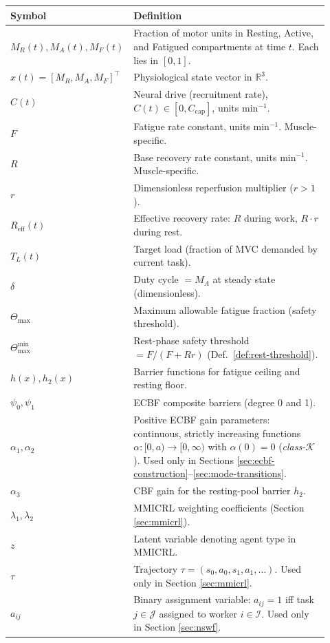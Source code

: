 \documentclass[11pt,a4paper]{article}
\begin{document}
\begin{center}
\begin{tabular}{p{0.30\linewidth}p{0.62\linewidth}}
\toprule
\textbf{Symbol} & \textbf{Definition} \\
\midrule
$M_R(t), M_A(t), M_F(t)$ & Fraction of motor units in Resting, Active, and Fatigued compartments at time $t$. Each lies in $[0,1]$. \\
$x(t) = [M_R, M_A, M_F]^\top$ & Physiological state vector in $\mathbb{R}^3$. \\
$C(t)$ & Neural drive (recruitment rate), $C(t) \in [0, C_{\mathrm{cap}}]$, units min$^{-1}$. \\
$F$ & Fatigue rate constant, units min$^{-1}$. Muscle-specific. \\
$R$ & Base recovery rate constant, units min$^{-1}$. Muscle-specific. \\
$r$ & Dimensionless reperfusion multiplier ($r > 1$). \\
$R_{\mathrm{eff}}(t)$ & Effective recovery rate: $R$ during work, $R \cdot r$ during rest. \\
$T_L(t)$ & Target load (fraction of MVC demanded by current task). \\
$\delta$ & Duty cycle $= M_A$ at steady state (dimensionless). \\
$\Theta_{\max}$ & Maximum allowable fatigue fraction (safety threshold). \\
$\Theta_{\max}^{\min}$ & Rest-phase safety threshold $= F/(F + Rr)$ (Def.~\ref{def:rest-threshold}). \\
$h(x), h_2(x)$ & Barrier functions for fatigue ceiling and resting floor. \\
$\psi_0, \psi_1$ & ECBF composite barriers (degree 0 and 1). \\
$\alpha_1, \alpha_2$ & Positive ECBF gain parameters: continuous, strictly increasing functions $\alpha:[0,a)\to[0,\infty)$ with $\alpha(0)=0$ (\emph{class-$\mathcal{K}$}). Used only in Sections \ref{sec:ecbf-construction}--\ref{sec:mode-transitions}. \\
$\alpha_3$ & CBF gain for the resting-pool barrier $h_2$. \\
$\lambda_1, \lambda_2$ & MMICRL weighting coefficients (Section \ref{sec:mmicrl}). \\
$z$ & Latent variable denoting agent type in MMICRL. \\
$\tau$ & Trajectory $\tau = (s_0, a_0, s_1, a_1, \ldots)$. Used only in Section \ref{sec:mmicrl}. \\
$a_{ij}$ & Binary assignment variable: $a_{ij} = 1$ iff task $j \in \mathcal{J}$ assigned to worker $i \in \mathcal{I}$. Used only in Section \ref{sec:nswf}. \\

\end{tabular}
\end{center}
\end{document}
